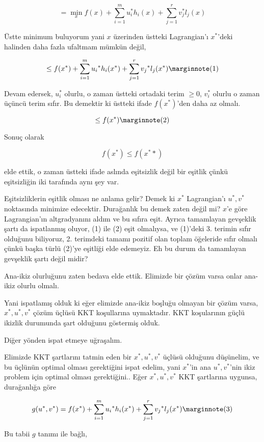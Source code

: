 \documentclass[12pt,fleqn]{article}\usepackage{../../common}
\begin{document}
$$
= \min_x f(x) + \sum_{i=1}^{m} u_i^\ast h_i(x) + \sum_{j=1}^{r} v_j^\ast l_j(x) 
$$
 
Üstte minimum buluyorum yani $x$ üzerinden üstteki Lagrangian'ı $x^\ast$'deki
halinden daha fazla ufaltmam mümkün değil,

$$
\le f(x^\ast) + \sum_{i=1}^{m} u_i{^\ast} h_i(x^\ast) + \sum_{j=1}^{r} v_j{^\ast} l_j(x^\ast) 
\mlabel{1}
$$

Devam edersek, $u_i^\ast$ olurlu, o zaman üstteki ortadaki terim $\ge 0$,
$v_i^\ast$ olurlu o zaman üçüncü terim sıfır. Bu demektir ki üstteki ifade
$f(x^\ast)$'den daha az olmalı.

$$
\le f(x^\ast) 
\mlabel{2}
$$

Sonuç olarak 

$$
f(x^\ast) \le f(x^\ast*)
$$

elde ettik, o zaman üstteki ifade aslında eşitsizlik değil bir eşitlik
çünkü eşitsizliğin iki tarafında aynı şey var. 

Eşitsizliklerin eşitlik olması ne anlama gelir? Demek ki $x^\ast$ Lagrangian'ı
$u^\ast,v^\ast$ noktasında minimize edecektir. Durağanlık bu demek zaten değil
mi? $x$'e göre Lagrangian'ın altgradyanını aldım ve bu sıfıra eşit.  Ayrıca
tamamlayan gevşeklik şartı da ispatlanmış oluyor, (1) ile (2) eşit
olmalıysa, ve (1)'deki 3. terimin sıfır olduğunu biliyoruz, 2. terimdeki
tamamı pozitif olan toplam öğeleride sıfır olmalı çünkü başka türlü (2)'ye
eşitliği elde edemeyiz. Eh bu durum da tamamlayan gevşeklik şartı değil
midir?

Ana-ikiz olurluğunu zaten bedava elde ettik. Elimizde bir çözüm varsa onlar
ana-ikiz olurlu olmalı. 

Yani ispatlamış olduk ki eğer elimizde ana-ikiz boşluğu olmayan bir çözüm
varsa, $x^\ast,u^\ast,v^\ast$ çözüm üçlüsü KKT koşullarına uymaktadır. KKT
koşularının güçlü ikizlik durumunda şart olduğunu göstermiş olduk.

Diğer yönden ispat etmeye uğraşalım. 

Elimizde KKT şartlarını tatmin eden bir $x^\ast,u^\ast,v^\ast$ üçlüsü olduğunu
düşünelim, ve bu üçlünün optimal olması gerektiğini ispat edelim, yani
$x^\ast$'in ana $u^\ast,v^\ast$'nin ikiz problem için optimal olması
gerektiğini.. Eğer $x^\ast,u^\ast,v^\ast$ KKT şartlarına uygunsa, durağanlığa göre

$$
g(u^\ast,v^\ast) = f(x^\ast) + \sum_{i=1}^{m} u_i{^\ast} h_i(x^\ast) + \sum_{j=1}^{r} v_j{^\ast} l_j(x^\ast) 
\mlabel{3}
$$

Bu tabii $g$ tanımı ile bağlı,
\end{document}
